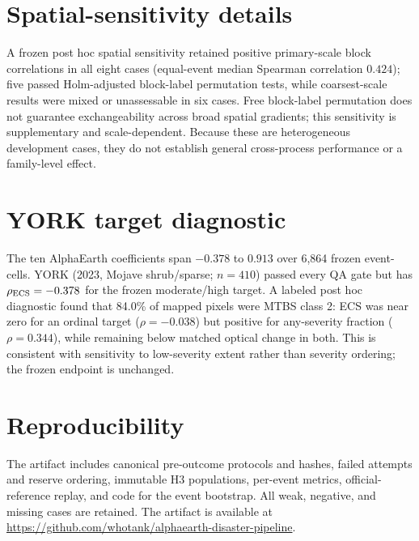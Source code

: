 \documentclass{article}
\begin{document}
\section{Spatial-sensitivity details}
\label{app:spatial}

A frozen post hoc spatial sensitivity retained positive primary-scale block
correlations in all eight cases (equal-event median Spearman correlation
$0.424$); five passed Holm-adjusted block-label permutation tests, while
coarsest-scale results were mixed or unassessable in six cases. Free
block-label permutation does not guarantee exchangeability across broad
spatial gradients; this sensitivity is supplementary and scale-dependent.
Because these are heterogeneous development cases, they do not establish
general cross-process performance or a family-level effect.

\section{YORK target diagnostic}
\label{app:york}

The ten AlphaEarth coefficients span $-0.378$ to $0.913$ over 6,864 frozen
event-cells. YORK (2023, Mojave shrub/sparse; $n=410$) passed every QA gate but
has $\rho_{\rm ECS}=-0.378$ for the frozen moderate/high target. A labeled post
hoc diagnostic found that 84.0\% of mapped pixels were MTBS class 2: ECS was
near zero for an ordinal target ($\rho=-0.038$) but positive for any-severity
fraction ($\rho=0.344$), while remaining below matched optical change in both.
This is consistent with sensitivity to low-severity extent rather than
severity ordering; the frozen endpoint is unchanged.

\section{Reproducibility}
\label{app:reproducibility}

The artifact includes canonical pre-outcome protocols and hashes, failed
attempts and reserve ordering, immutable H3 populations, per-event metrics,
official-reference replay, and code for the event bootstrap. All weak,
negative, and missing cases are retained. The artifact is available at
\url{https://github.com/whotank/alphaearth-disaster-pipeline}.
\end{document}
